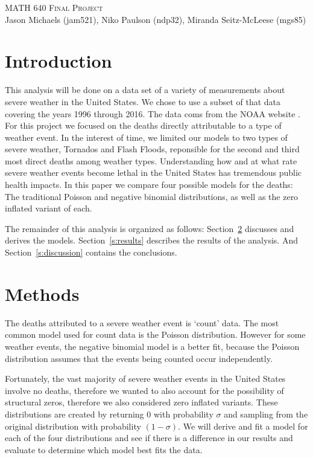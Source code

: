 \documentclass{article}\usepackage[]{graphicx}\usepackage[]{color}
\begin{document}
\begin{center}
	\vspace{0.1cm}
	\textsc{\LARGE MATH 640 Final Project} \\[0.1cm]
	Jason Michaels (jam521), Niko Paulson (ndp32), Miranda Seitz-McLeese (mgs85) 
\end{center}
\section{Introduction}
\label{s:intro}
This analysis will be done on a data set of a variety of measurements about severe weather in the United States. 
We chose to use a subset of that data covering the years 1996 through 2016. The data coms from the NOAA website \cite{dataset}. For this project we focused on the deaths directly attributable to a type of weather event. In the interest of time, we limited our models to two types of severe weather, Tornados and Flash Floods, reponsible for the second and third most direct deaths among weather types. Understanding how and at what rate severe weather events become lethal in the United States has tremendous public health impacts. In this paper we compare four possible models for the deaths: The traditional Poisson and negative binomial distributions, as well as the zero inflated variant of each. 

The remainder of this analysis is organized as follows: Section~\ref{s:methods} discusses and derives the models. Section~\ref{s:results} describes the results of the analysis. And Section~\ref{s:discussion} contains the conclusions.

\section{Methods}
\label{s:methods}
The deaths attributed to a severe weather event is `count' data. 
The most common model used for count data is the Poisson distribution. 
However for some weather events, the negative binomial model is a better fit, because the Poisson distribution assumes that the events being counted occur independently.

Fortunately, the vast majority of severe weather events in the United States involve no deaths, therefore we wanted to also account for the possibility of structural zeros, therefore we also considered zero inflated variants. 
These distributions are created by returning $0$ with probability $\sigma$ and sampling from the original distribution with probability $(1-\sigma)$. We will derive and fit a model for each of the four distributions and see if there is a difference in our results and evaluate to determine which model best fits the data.
\end{document}
